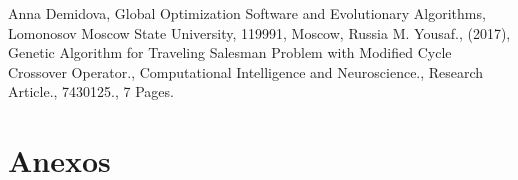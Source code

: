 \documentclass[10pt,letterpaper]{article}
\begin{document}
\begin{thebibliography}{0}
	\bibitem{} Anna Demidova, Global Optimization Software and Evolutionary Algorithms, Lomonosov Moscow State University, 119991, Moscow, Russia
	\bibitem{} M. Yousaf., (2017), Genetic Algorithm for Traveling Salesman Problem with Modified Cycle Crossover Operator., Computational Intelligence and Neuroscience., Research Article., 7430125., 7 Pages.
\end  {thebibliography}

\section{Anexos}

\end{document}
